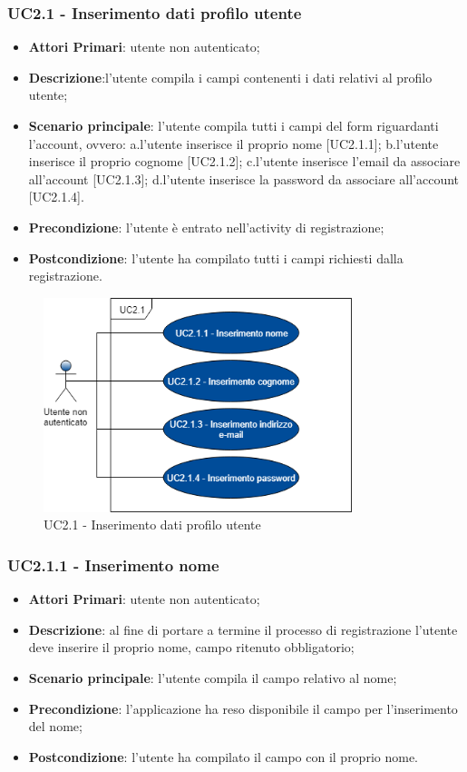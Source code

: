 \subsubsection{UC2.1 - Inserimento dati profilo utente}
\begin{itemize}
	\item \textbf{Attori Primari}: utente non autenticato;
	\item \textbf{Descrizione}:l'utente compila i campi contenenti i dati relativi al profilo utente;
	\item \textbf{Scenario principale}: l'utente compila tutti i campi del form riguardanti l'account, ovvero:
	a.l'utente inserisce il proprio nome [UC2.1.1];
	\newline
	b.l'utente inserisce il proprio cognome [UC2.1.2];
	\newline
	c.l'utente inserisce l'email da associare all'account [UC2.1.3];
	\newline
	d.l'utente inserisce la password da associare all'account [UC2.1.4].
	\item \textbf{Precondizione}: l'utente è entrato nell'activity di registrazione;
	\item \textbf{Postcondizione}: l'utente ha compilato tutti i campi richiesti dalla registrazione.
\end{itemize}
\begin{figure}[h]
	\includegraphics[width=9cm]{res/images/UC2-1Inserimento.png}
	\centering
	\caption{UC2.1 - Inserimento dati profilo utente}
\end{figure}
\subsubsection{UC2.1.1 - Inserimento nome}
\begin{itemize}
	\item \textbf{Attori Primari}: utente non autenticato;
	\item \textbf{Descrizione}: al fine di portare a termine il processo di registrazione l'utente deve inserire il proprio nome, campo ritenuto obbligatorio;
	\item \textbf{Scenario principale}: l'utente compila il campo relativo al nome;	
	\item \textbf{Precondizione}: l'applicazione ha reso disponibile il campo per l'inserimento del nome;
	\item \textbf{Postcondizione}: l'utente ha compilato il campo con il proprio nome.	
\end{itemize}
